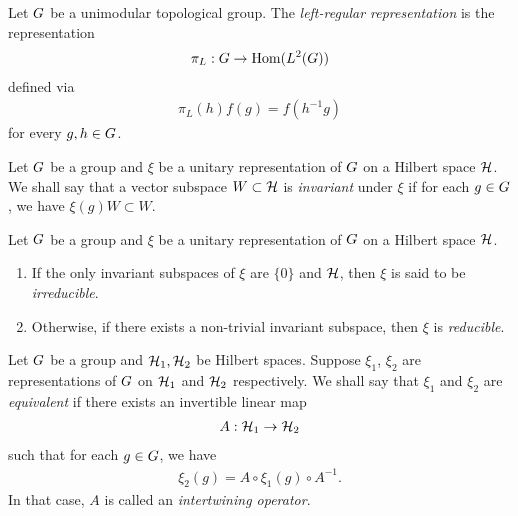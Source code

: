 \begin{example}
    Let $G$ be a unimodular topological group.
    The \emph{left-regular representation} is the representation
    \begin{align*}
        \pi_L : G \to \operatorname{Hom}({L^{2} (G)})
    \end{align*}
    defined via
    \begin{align*}
        \pi_L(h) f(g) = f(h^{-1} g)
    \end{align*}
    for every $g, h \in G$.
\end{example}

\begin{definition}
\label{definition:invariant_subspaces}
    Let $G$ be a group and $\xi$ be a unitary representation of $G$ on a Hilbert space $\mathcal{H}$.
    We shall say that a vector subspace $W \subset \mathcal{H}$ is \emph{invariant} under $\xi$
    if for each $g \in G$, we have $\xi(g) W \subset W$.
\end{definition}

\begin{definition}[Irreducibility]
\label{definition:irreducible_representations}
    Let $G$ be a group and $\xi$ be a unitary representation of $G$ on a Hilbert space $\mathcal{H}$.
    \begin{enumerate}
        \item If the only invariant subspaces of $\xi$ are $\{0\}$ and $\mathcal{H}$,
            then $\xi$ is said to be \emph{irreducible}.
        \item Otherwise, if there exists a non-trivial invariant subspace,
            then $\xi$ is \emph{reducible}.
    \end{enumerate}
\end{definition}

\begin{definition}
\label{definition:equivalent_representations}
    Let $G$ be a group and $\mathcal{H}_1, \mathcal{H}_2$ be Hilbert spaces.
    Suppose $\xi_1$, $\xi_2$ are representations of $G$ on $\mathcal{H}_1$ and $\mathcal{H}_2$ respectively.
    We shall say that $\xi_1$ and $\xi_2$ are \emph{equivalent}
    if there exists an invertible linear map
    \begin{align*}
        A : \mathcal{H}_1 \to \mathcal{H}_2
    \end{align*}
    such that for each $g \in G$, we have
    \begin{align*}
        \xi_2(g) = A \circ \xi_1(g) \circ A^{-1}.
    \end{align*}
    In that case, $A$ is called an \emph{intertwining operator}.
\end{definition}

